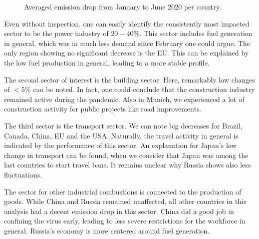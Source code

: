 \begin{figure}[H]
	\caption{Averaged emission drop from January to June 2020 per country.}
	\label{fig:bar_plots2}
\end{figure}

Even without inspection, one can easily identify the consistently most impacted sector to be the power industry of $20-40\%$. This sector includes fuel generation in general, which was in much less demand since February one could argue. The only region showing no significant decrease is the EU. This can be explained by the low fuel production in general, leading to a more stable profile.

The second sector of interest is the building sector. Here, remarkably low changes of $<5\%$ can be noted. In fact, one could conclude that the construction industry remained active during the pandemic. Also in Munich, we experienced a lot of construction activity for public projects like road improvements.

The third sector is the transport sector. We can note big decreases for Brazil, Canada, China, EU and the USA. 
Naturally, the travel activity in general is indicated by the performance of this sector. An explanation for Japan's low change in transport can be found, when we consider that Japan was among the last countries to start travel bans.
It remains unclear why Russia shows also less fluctuations.

The sector for other industrial combustions is connected to the production of goods. While China and Russia remained unaffected, all other countries in this analysis had a decent emission drop in this sector. China did a good job in confining the virus early, leading to less severe restrictions for the workforce in general. Russia's economy is more centered around fuel generation.

